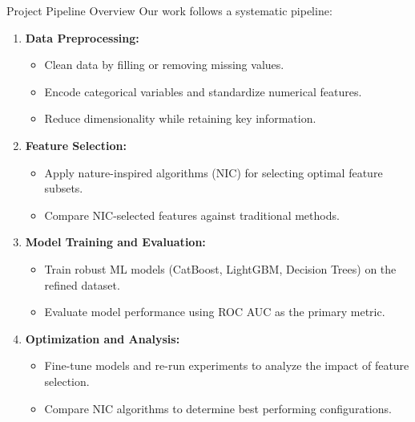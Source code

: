 \documentclass[aspectratio=169,xcolor=dvipsnames]{beamer}
\begin{document}
\begin{frame}{Project Pipeline Overview}
    Our work follows a systematic pipeline:
    \begin{enumerate}
        \item \textbf{Data Preprocessing:}  
        \begin{itemize}
            \item Clean data by filling or removing missing values.
            \item Encode categorical variables and standardize numerical features.
            \item Reduce dimensionality while retaining key information.
        \end{itemize}
        \item \textbf{Feature Selection:}  
        \begin{itemize}
            \item Apply nature-inspired algorithms (NIC) for selecting optimal feature subsets.
            \item Compare NIC-selected features against traditional methods.
        \end{itemize}
        \item \textbf{Model Training and Evaluation:}  
        \begin{itemize}
            \item Train robust ML models (CatBoost, LightGBM, Decision Trees) on the refined dataset.
            \item Evaluate model performance using ROC AUC as the primary metric.
        \end{itemize}
        \item \textbf{Optimization and Analysis:}  
        \begin{itemize}
            \item Fine-tune models and re-run experiments to analyze the impact of feature selection.
            \item Compare NIC algorithms to determine best performing configurations.
        \end{itemize}
    \end{enumerate}
\end{frame}
\end{document}
